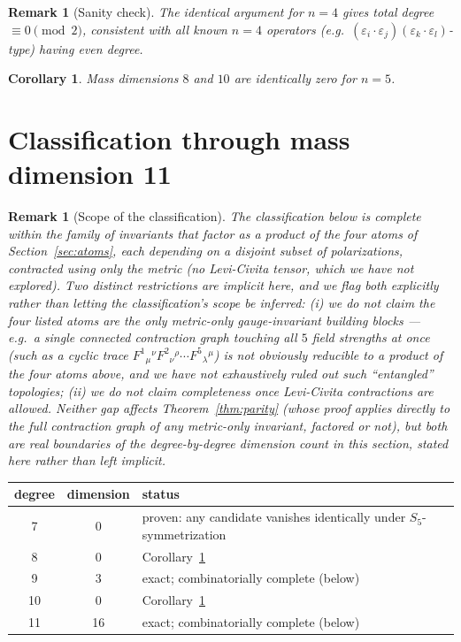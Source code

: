 \documentclass[reqno]{amsart}
\newtheorem{corollary}[theorem]{Corollary}
\newtheorem{remark}[theorem]{Remark}
\begin{document}
\begin{remark}[Sanity check]
The identical argument for $n=4$ gives total degree $\equiv0\pmod2$, consistent with all known
$n=4$ operators (e.g.\ $(\varepsilon_i\cdot\varepsilon_j)(\varepsilon_k\cdot\varepsilon_l)$-type)
having even degree.
\end{remark}

\begin{corollary}
\label{cor:parity}
Mass dimensions $8$ and $10$ are identically zero for $n=5$.
\end{corollary}

\section{Classification through mass dimension 11}
\label{sec:class}

\begin{remark}[Scope of the classification]
\label{rem:scope}
The classification below is complete \emph{within the family of invariants that factor as a
product of the four atoms of Section~\ref{sec:atoms}, each depending on a disjoint subset of
polarizations, contracted using only the metric} (no Levi-Civita tensor, which we have not
explored). Two distinct restrictions are implicit here, and we flag both explicitly rather than
letting the classification's scope be inferred: (i) we do not claim the four listed atoms are the
only \emph{metric-only} gauge-invariant building blocks --- e.g.\ a single connected contraction
graph touching all $5$ field strengths at once (such as a cyclic trace
$F^1{}_\mu{}^\nu F^2{}_\nu{}^\rho\cdots F^5{}_\lambda{}^\mu$) is not obviously reducible to a
product of the four atoms above, and we have not exhaustively ruled out such ``entangled''
topologies; (ii) we do not claim completeness once Levi-Civita contractions are allowed. Neither
gap affects Theorem~\ref{thm:parity} (whose proof applies directly to the full contraction graph of
any metric-only invariant, factored or not), but both are real boundaries of the degree-by-degree
dimension count in this section, stated here rather than left implicit.
\end{remark}

\begin{center}
\small
\begin{tabular}{@{}c c p{7cm}@{}}
\hline
degree & dimension & status \\
\hline
7 & 0 & proven: any candidate vanishes identically under $S_5$-symmetrization \\[2pt]
8 & 0 & Corollary~\ref{cor:parity} \\[2pt]
9 & 3 & exact; combinatorially complete (below) \\[2pt]
10 & 0 & Corollary~\ref{cor:parity} \\[2pt]
11 & 16 & exact; combinatorially complete (below) \\
\hline
\end{tabular}
\end{center}
\end{document}
